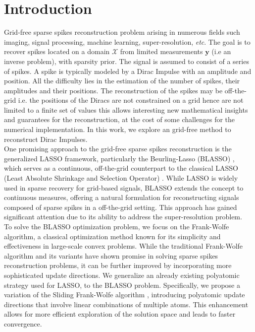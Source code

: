 \documentclass[a4paper,12pt,oneside]{report}
\theoremstyle{named}
\begin{document}
\chapter{Introduction}
Grid-free sparse spikes reconstruction problem arising in numerous fields such imaging, signal processing, machine learning, super-resolution, \textit{etc}. The goal is to recover spikes located on a domain $\mathcal{X}$ from limited measurements $\mathbf{y}$ (i.e an inverse problem), with sparsity prior. The signal is assumed to consist of a series of spikes. A spike is typically modeled by a Dirac Impulse with an amplitude and position. All the difficulty lies in the estimation of the number of spikes, their amplitudes and their positions. The reconstruction of the spikes may be off-the-grid i.e. the positions of the Diracs are not
constrained on a grid hence are not limited to a finite set of values this allows interesting new mathematical insights and guarantees for the reconstruction, at the cost of some challenges for the numerical implementation. In this work, we explore an grid-free method to reconstruct Dirac Impulses.\\

One promising approach to the grid-free sparse spikes reconstruction is the generalized LASSO framework, particularly the Beurling-Lasso (BLASSO) \cite{Castro2012}, which serves as a continuous, off-the-grid counterpart to the classical LASSO (Least Absolute Shrinkage and Selection Operator) \cite{Tibshirani1996}. While LASSO is widely used in sparse recovery for grid-based signals, BLASSO extends the concept to continuous measures, offering a natural formulation for reconstructing signals composed of sparse spikes in a off-the-grid setting. This approach has gained significant attention due to its ability to address the super-resolution problem.\\

To solve the BLASSO optimization problem, we focus on the Frank-Wolfe algorithm, a classical optimization method known for its simplicity and effectiveness in large-scale convex problems. While the traditional Frank-Wolfe algorithm and its variants have shown promise in solving sparse spikes reconstruction problems, it can be further improved by incorporating more sophisticated update directions. We generalize an already existing polyatomic strategy \cite{Jarret_2022} used for LASSO, to the BLASSO problem. Specifically, we propose a variation of the Sliding Frank-Wolfe algorithm \cite{Denoyelle_2020}, introducing polyatomic update directions that involve linear combinations of multiple atoms. This enhancement allows for more efficient exploration of the solution space and leads to faster convergence.\\
\end{document}
